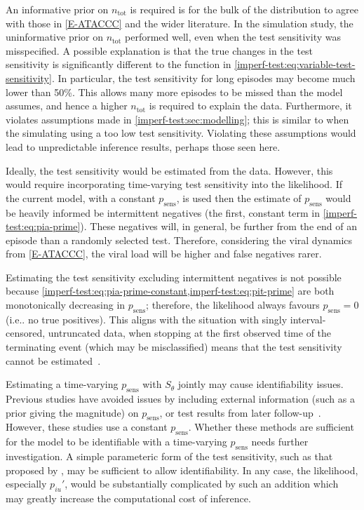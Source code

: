 \documentclass[12pt, letterpaper]{article} %
\makeatletter
\DeclareRobustCommand\onedot{\futurelet\@let@token\@onedot}
\def\@onedot{\ifx\@let@token.\else.\null\fi\xspace}
\def\ie{i.e\onedot} \def\Ie{\emph{I.e}\onedot}
\newcommand{\psens}{p_\text{sens}}
\newcommand{\ntot}{n_\text{tot}}
\makeatother
\begin{document}
An informative prior on $\ntot$ is required is for the bulk of the distribution to agree with those in \cref{E-ATACCC} and the wider literature.
In the simulation study, the uninformative prior on $\ntot$ performed well, even when the test sensitivity was misspecified.
A possible explanation is that the true changes in the test sensitivity is significantly different to the function in \cref{imperf-test:eq:variable-test-sensitivity}.
In particular, the test sensitivity for long episodes may become much lower than 50\%.
This allows many more episodes to be missed than the model assumes, and hence a higher $\ntot$ is required to explain the data.
Furthermore, it violates assumptions made in \cref{imperf-test:sec:modelling}; this is similar to when the simulating using a too low test sensitivity.
Violating these assumptions would lead to unpredictable inference results, perhaps those seen here.

Ideally, the test sensitivity would be estimated from the data.
However, this would require incorporating time-varying test sensitivity into the likelihood.
If the current model, with a constant $\psens$, is used then the estimate of $\psens$ would be heavily informed be intermittent negatives (the first, constant term in \cref{imperf-test:eq:pia-prime}).
These negatives will, in general, be further from the end of an episode than a randomly selected test.
Therefore, considering the viral dynamics from \cref{E-ATACCC}, the viral load will be higher and false negatives rarer.

Estimating the test sensitivity excluding intermittent negatives is not possible because \cref{imperf-test:eq:pia-prime-constant,imperf-test:eq:pit-prime} are both monotonically decreasing in $\psens$; therefore, the likelihood always favours $\psens = 0$ (\ie no true positives).
This aligns with the situation with singly interval-censored, untruncated data, when stopping at the first observed time of the terminating event (which may be misclassified) means that the test sensitivity cannot be estimated~\autocite[e.g.]{titmanMisclassify}.

Estimating a time-varying $\psens$ with $S_\theta$ jointly may cause identifiability issues.
Previous studies have avoided issues by including external information (such as a prior giving the magnitude) on $\psens$, or test results from later follow-up~\autocite[and references therein]{piresIntervalMisclassify}.
However, these studies use a constant $\psens$.
Whether these methods are sufficient for the model to be identifiable with a time-varying $\psens$ needs further investigation.
A simple parameteric form of the test sensitivity, such as that proposed by \textcite{brownBayesian}, may be sufficient to allow identifiability.
In any case, the likelihood, especially $p_{iu}'$, would be substantially complicated by such an addition which may greatly increase the computational cost of inference.
\end{document}
